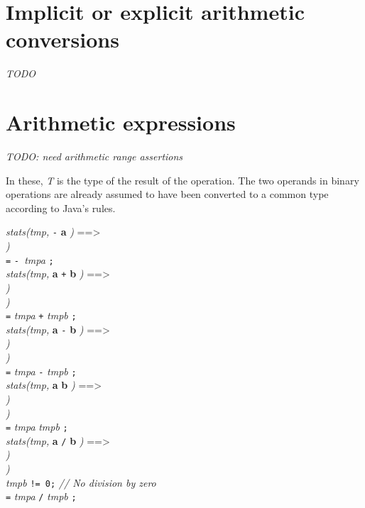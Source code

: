 \documentclass{report}%
\newcommand{\ind}{\hspace*{2em}}
\begin{document}
\section{Implicit or explicit arithmetic conversions}

{\em TODO}

\section{Arithmetic expressions}
{\em TODO: need arithmetic range assertions}

In these, {\em T} is the type of the result of the operation. The two operands in binary operations are already assumed to have been converted to a common type according to Java's rules.

\noindent
{\em stats(tmp, }{\tt -} {\bf a} {\em )} ==> \\
\ind {\em stats(tmpa, }{\bf a} {\em )} \\
\ind {\em T tmp} {\tt =} {\tt - }{\em tmpa} {\tt ;} \\

\noindent
{\em stats(tmp, }{\bf a} {\tt +} {\bf b} {\em )} ==> \\
\ind {\em stats(tmpa, }{\bf a} {\em )} \\
\ind {\em stats(tmpb, }{\bf b} {\em )} \\
\ind {\em T tmp} {\tt =} {\em tmpa} {\tt +} {\em tmpb} {\tt ;} \\

\noindent
{\em stats(tmp, }{\bf a} {\tt -} {\bf b} {\em )} ==> \\
\ind {\em stats(tmpa, }{\bf a} {\em )} \\
\ind {\em stats(tmpb, }{\bf b} {\em )} \\
\ind {\em T tmp} {\tt =} {\em tmpa} {\tt -} {\em tmpb} {\tt ;}\\

\noindent
{\em stats(tmp, }{\bf a} {\tt *} {\bf b} {\em )} ==> \\
\ind {\em stats(tmpa, }{\bf a} {\em )} \\
\ind {\em stats(tmpb, }{\bf b} {\em )} \\
\ind {\em T tmp} {\tt =} {\em tmpa} {\tt *} {\em tmpb} {\tt ;}\\

\noindent
{\em stats(tmp, }{\bf a} {\tt /} {\bf b} {\em )} ==> \\
\ind {\em stats(tmpa, }{\bf a} {\em )} \\
\ind {\em stats(tmpb, }{\bf b} {\em )} \\
\ind {\tt //@ assert} {\em tmpb} {\tt != 0;} {\em // No division by zero}\\
\ind {\em T tmp} {\tt =} {\em tmpa} {\tt /} {\em tmpb} {\tt ;}\\
\end{document}
